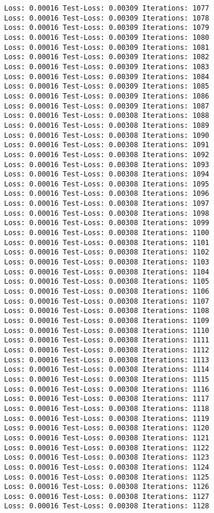 \documentclass[11pt]{article}
\begin{document}
\begin{Verbatim}[commandchars=\\\{\}]
Loss: 0.00016 Test-Loss: 0.00309 Iterations: 1077
Loss: 0.00016 Test-Loss: 0.00309 Iterations: 1078
Loss: 0.00016 Test-Loss: 0.00309 Iterations: 1079
Loss: 0.00016 Test-Loss: 0.00309 Iterations: 1080
Loss: 0.00016 Test-Loss: 0.00309 Iterations: 1081
Loss: 0.00016 Test-Loss: 0.00309 Iterations: 1082
Loss: 0.00016 Test-Loss: 0.00309 Iterations: 1083
Loss: 0.00016 Test-Loss: 0.00309 Iterations: 1084
Loss: 0.00016 Test-Loss: 0.00309 Iterations: 1085
Loss: 0.00016 Test-Loss: 0.00309 Iterations: 1086
Loss: 0.00016 Test-Loss: 0.00309 Iterations: 1087
Loss: 0.00016 Test-Loss: 0.00308 Iterations: 1088
Loss: 0.00016 Test-Loss: 0.00308 Iterations: 1089
Loss: 0.00016 Test-Loss: 0.00308 Iterations: 1090
Loss: 0.00016 Test-Loss: 0.00308 Iterations: 1091
Loss: 0.00016 Test-Loss: 0.00308 Iterations: 1092
Loss: 0.00016 Test-Loss: 0.00308 Iterations: 1093
Loss: 0.00016 Test-Loss: 0.00308 Iterations: 1094
Loss: 0.00016 Test-Loss: 0.00308 Iterations: 1095
Loss: 0.00016 Test-Loss: 0.00308 Iterations: 1096
Loss: 0.00016 Test-Loss: 0.00308 Iterations: 1097
Loss: 0.00016 Test-Loss: 0.00308 Iterations: 1098
Loss: 0.00016 Test-Loss: 0.00308 Iterations: 1099
Loss: 0.00016 Test-Loss: 0.00308 Iterations: 1100
Loss: 0.00016 Test-Loss: 0.00308 Iterations: 1101
Loss: 0.00016 Test-Loss: 0.00308 Iterations: 1102
Loss: 0.00016 Test-Loss: 0.00308 Iterations: 1103
Loss: 0.00016 Test-Loss: 0.00308 Iterations: 1104
Loss: 0.00016 Test-Loss: 0.00308 Iterations: 1105
Loss: 0.00016 Test-Loss: 0.00308 Iterations: 1106
Loss: 0.00016 Test-Loss: 0.00308 Iterations: 1107
Loss: 0.00016 Test-Loss: 0.00308 Iterations: 1108
Loss: 0.00016 Test-Loss: 0.00308 Iterations: 1109
Loss: 0.00016 Test-Loss: 0.00308 Iterations: 1110
Loss: 0.00016 Test-Loss: 0.00308 Iterations: 1111
Loss: 0.00016 Test-Loss: 0.00308 Iterations: 1112
Loss: 0.00016 Test-Loss: 0.00308 Iterations: 1113
Loss: 0.00016 Test-Loss: 0.00308 Iterations: 1114
Loss: 0.00016 Test-Loss: 0.00308 Iterations: 1115
Loss: 0.00016 Test-Loss: 0.00308 Iterations: 1116
Loss: 0.00016 Test-Loss: 0.00308 Iterations: 1117
Loss: 0.00016 Test-Loss: 0.00308 Iterations: 1118
Loss: 0.00016 Test-Loss: 0.00308 Iterations: 1119
Loss: 0.00016 Test-Loss: 0.00308 Iterations: 1120
Loss: 0.00016 Test-Loss: 0.00308 Iterations: 1121
Loss: 0.00016 Test-Loss: 0.00308 Iterations: 1122
Loss: 0.00016 Test-Loss: 0.00308 Iterations: 1123
Loss: 0.00016 Test-Loss: 0.00308 Iterations: 1124
Loss: 0.00016 Test-Loss: 0.00308 Iterations: 1125
Loss: 0.00016 Test-Loss: 0.00308 Iterations: 1126
Loss: 0.00016 Test-Loss: 0.00308 Iterations: 1127
Loss: 0.00016 Test-Loss: 0.00308 Iterations: 1128

\end{Verbatim}
\end{document}
